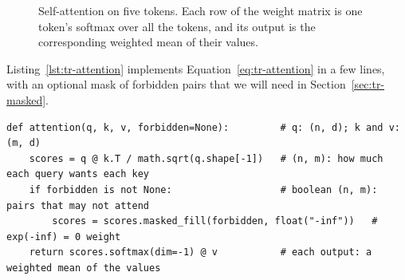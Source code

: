 \begin{figure}[t]
\centering
{}
\caption{Self-attention on five tokens. Each row of the weight matrix is one token's softmax over all
the tokens, and its output is the corresponding weighted mean of their values.
}
\label{fig:tr-attention}
\end{figure}

Listing~\ref{lst:tr-attention} implements Equation~\eqref{eq:tr-attention} in a few lines, with an
optional mask of forbidden pairs that we will need in Section~\ref{sec:tr-masked}.

\begin{lstlisting}[caption={Scaled dot-product attention with an optional mask.},label=lst:tr-attention]
def attention(q, k, v, forbidden=None):         # q: (n, d); k and v: (m, d)
    scores = q @ k.T / math.sqrt(q.shape[-1])   # (n, m): how much each query wants each key
    if forbidden is not None:                   # boolean (n, m): pairs that may not attend
        scores = scores.masked_fill(forbidden, float("-inf"))   # exp(-inf) = 0 weight
    return scores.softmax(dim=-1) @ v           # each output: a weighted mean of the values
\end{lstlisting}

